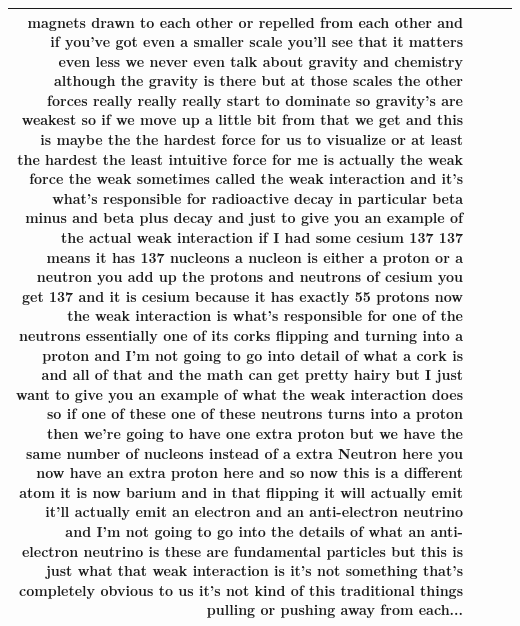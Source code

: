\documentclass[10pt]{article}
\begin{document}
\begin{tiny}
\begin{longtable}{|r|p{0.375in}|p{1.275in}|p{3.5in}|}
magnets drawn to each other or repelled from each other and if you've got even a smaller scale you'll see that it matters even less we never even talk about gravity and chemistry although the gravity is there but at those scales the other forces really really really start to dominate so gravity's are weakest so if we move up a little bit from that we get and this is maybe the the hardest force for us to visualize or at least the hardest the least intuitive force for me is actually the weak force the weak sometimes called the weak interaction and it's what's responsible for radioactive decay in particular beta minus and beta plus decay and just to give you an example of the actual weak interaction if I had some cesium 137 137 means it has 137 nucleons a nucleon is either a proton or a neutron you add up the protons and neutrons of cesium you get 137 and it is cesium because it has exactly 55 protons now the weak interaction is what's responsible for one of the neutrons essentially one of its corks flipping and turning into a proton and I'm not going to go into detail of what a cork is and all of that and the math can get pretty hairy but I just want to give you an example of what the weak interaction does so if one of these one of these neutrons turns into a proton then we're going to have one extra proton but we have the same number of nucleons instead of a extra Neutron here you now have an extra proton here and so now this is a different atom it is now barium and in that flipping it will actually emit it'll actually emit an electron and an anti-electron neutrino and I'm not going to go into the details of what an anti-electron neutrino is these are fundamental particles but this is just what that weak interaction is it's not something that's completely obvious to us it's not kind of this traditional things pulling or pushing away from each... \\\hline

\end{longtable}
\end{tiny}
\end{document}
